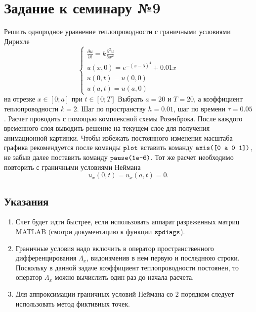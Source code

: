 \section{Задание к семинару №9}
Решить однородное уравнение теплопроводности с граничными условиями Дирихле 
\begin{equation} \label{c9eq1}
	\begin{cases}
		\displaystyle \frac{\partial u}{\partial t} = k \frac{\partial^2 u}{\partial x^2} \\
		\displaystyle u(x,0) = e^{-(x-5)^4} + 0.01x \\
		u(0,t) = u(0,0) \\  
		u(a,t) = u(a,0)
	\end{cases}
\end{equation}
на отрезке $x \in [0; a]$ при $t \in [0; T]$ Выбрать $a = 20$ и $T = 20$, а коэффициент теплопроводности $k = 2$. Шаг по пространству $h = 0.01$, шаг по времени $\tau = 0.05$. Расчет проводить с помощью комплексной схемы Розенброка. После каждого временного слоя выводить решение на текущем слое для получения анимационной картинки. Чтобы избежать постоянного изменения масштаба графика рекомендуется после команды $\texttt{\lstinline|plot|}$ вставить команду $\texttt{\lstinline|axis([0 a 0 1])|}$, не забыв далее поставить команду $\texttt{\lstinline|pause(1e-6)|}$.
Тот же расчет необходимо повторить с граничными условиями Неймана
\begin{equation} \label{c9eq2}
	u_x(0,t) = u_x(a,t) = 0.
\end{equation}

\subsection{Указания}
\begin{enumerate}
\item Счет будет идти быстрее, если использовать аппарат разреженных матриц MATLAB (смотри документацию к функции $\texttt{\lstinline|spdiags|}$).
\item Граничные условия надо включить в оператор пространственного дифференцирования $\Lambda_x$, видоизменив в нем первую и последнюю строки. Поскольку в данной задаче коэффициент теплопроводности постоянен, то оператор $\Lambda_x$ можно вычислить один раз до начала расчета.
\item Для аппроксимации граничных условий Неймана со 2 порядком следует использовать метод фиктивных точек.
\end{enumerate}


